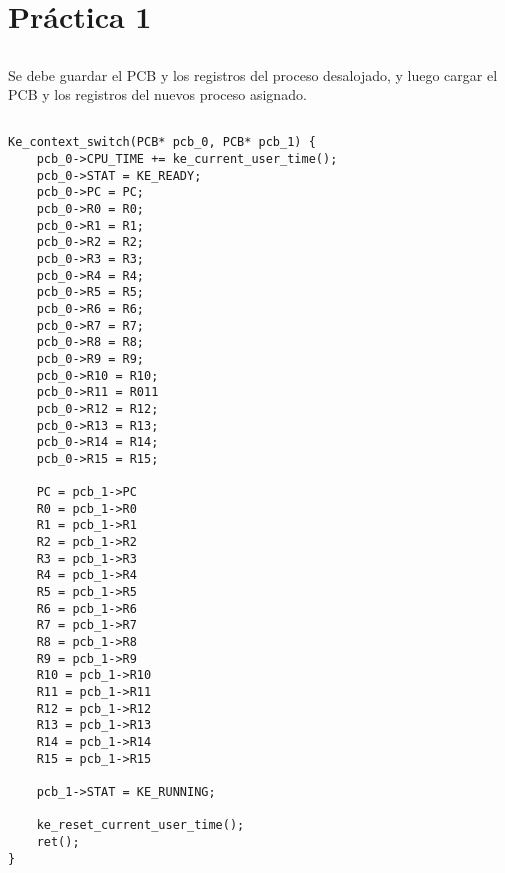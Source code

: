 \section{Práctica 1}

\subsection{}

Se debe guardar el PCB y los registros del proceso desalojado, y luego cargar
el PCB y los registros del nuevos proceso asignado.

\subsection{}

\begin{codesnippet}
\begin{verbatim}
Ke_context_switch(PCB* pcb_0, PCB* pcb_1) {
    pcb_0->CPU_TIME += ke_current_user_time();
    pcb_0->STAT = KE_READY;
    pcb_0->PC = PC;
    pcb_0->R0 = R0;
    pcb_0->R1 = R1;
    pcb_0->R2 = R2;
    pcb_0->R3 = R3;
    pcb_0->R4 = R4;
    pcb_0->R5 = R5;
    pcb_0->R6 = R6;
    pcb_0->R7 = R7;
    pcb_0->R8 = R8;
    pcb_0->R9 = R9;
    pcb_0->R10 = R10;
    pcb_0->R11 = R011
    pcb_0->R12 = R12;
    pcb_0->R13 = R13;
    pcb_0->R14 = R14;
    pcb_0->R15 = R15;

    PC = pcb_1->PC
    R0 = pcb_1->R0
    R1 = pcb_1->R1
    R2 = pcb_1->R2
    R3 = pcb_1->R3
    R4 = pcb_1->R4
    R5 = pcb_1->R5
    R6 = pcb_1->R6
    R7 = pcb_1->R7
    R8 = pcb_1->R8
    R9 = pcb_1->R9
    R10 = pcb_1->R10
    R11 = pcb_1->R11
    R12 = pcb_1->R12
    R13 = pcb_1->R13
    R14 = pcb_1->R14
    R15 = pcb_1->R15

    pcb_1->STAT = KE_RUNNING;

    ke_reset_current_user_time();
    ret();
}
\end{verbatim}
\end{codesnippet}
